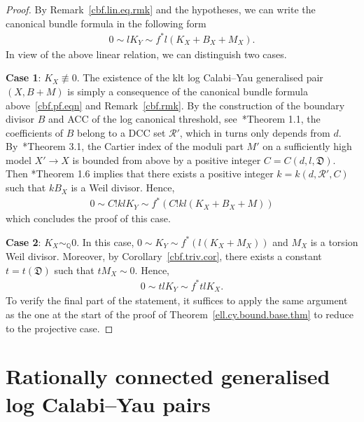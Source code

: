 \documentclass[11pt]{ip-journal}
\theoremstyle{definition}
\begin{document}
\begin{proof}
By Remark~\ref{cbf.lin.eq.rmk} and the hypotheses, we can write the canonical bundle formula in the following form
\begin{align}
\label{cbf.pf.eqn}
0 \sim lK_Y \sim f^\ast l(K_X+B_X+M_X).
\end{align}
In view of the above linear relation, we can distinguish two cases.

\medskip

{\bf Case 1}: 
$K_X \not \equiv 0$.
\newline
The existence of the klt log Calabi--Yau generalised pair
$(X, B+M)$
is simply a consequence of the canonical bundle formula above~\eqref{cbf.pf.eqn} and Remark~\ref{cbf.rmk}.
By the construction of the boundary divisor 
$B$ 
and ACC of the log canonical threshold, see~\cite{MR3224718}*{Theorem 1.1}, the coefficients of 
$B$ 
belong to a DCC set 
$\mathcal R'$, 
which in turns only depends from $d$.
By~\cite{MR1863025}*{Theorem 3.1}, the Cartier index of the moduli part 
$M'$
on a sufficiently high model 
$X' \to X$
is bounded from above by a positive integer 
$C=C(d, l, \mathfrak{D})$.
Then \cite{bir-zh}*{Theorem 1.6} implies that there exists a positive integer 
$k=k(d, \mathcal R', C)$ 
such that 
$kB_{X}$ 
is a Weil divisor.
Hence,
\begin{align*}
0 \sim 
C!klK_Y \sim 
f^\ast (C!kl(K_{X} + B_{X} + M))
\end{align*}
which concludes the proof of this case.

\medskip

{\bf Case 2}: $K_X \sim_\mathbb{Q} 0$.
\newline
In this case, 
$0 \sim K_Y \sim f^\ast(l(K_X+M_X))$ 
and 
$M_X$ 
is a torsion Weil divisor. 
Moreover, by Corollary~\ref{cbf.triv.cor}, there exists a constant 
$t=t(\mathfrak D)$ 
such that 
$tM_X \sim 0$.
Hence,
\begin{align*}
0 \sim tlK_Y \sim f^\ast tlK_X.
\end{align*}
To verify the final part of the statement, it suffices to apply the same argument as the one at the start of the proof of Theorem~\ref{ell.cy.bound.base.thm} to reduce to the projective case.
\end{proof}

\section{Rationally connected generalised log Calabi--Yau pairs}
\label{rc.gen.cy.sect}
\end{document}
